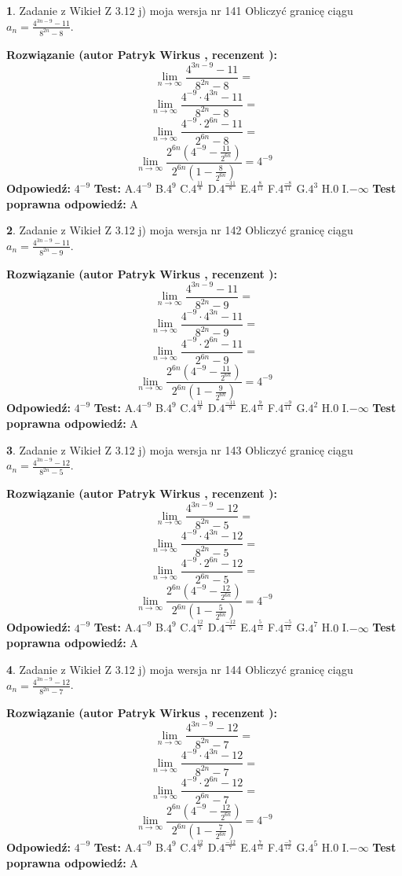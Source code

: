 \documentclass[12pt, a4paper]{article}
\theoremstyle{definition} %
\newtheorem{zad}{}
\newcommand{\zadStart}[1]{\begin{zad}#1\newline}
\newcommand{\zadStop}{\end{zad}}
\newcommand{\rozwStart}[2]{\noindent \textbf{Rozwiązanie (autor #1 , recenzent #2): }\newline}
\newcommand{\rozwStop}{\newline}
\newcommand{\odpStart}{\noindent \textbf{Odpowiedź:}\newline}
\newcommand{\odpStop}{\newline}
\newcommand{\testStart}{\noindent \textbf{Test:}\newline}
\newcommand{\testStop}{\newline}
\newcommand{\kluczStart}{\noindent \textbf{Test poprawna odpowiedź:}\newline}
\newcommand{\kluczStop}{\newline}
\begin{document}
\zadStart{Zadanie z Wikieł Z 3.12 j) moja wersja nr 141}
Obliczyć granicę ciągu $a_{n}=\frac{4^{3n-9}-11}{8^{2n}-8}$.
\zadStop
\rozwStart{Patryk Wirkus}{}
$$\lim\limits_{n\to\infty}\frac{4^{3n-9}-11}{8^{2n}-8}=$$
$$\lim\limits_{n\to\infty}\frac{4^{-9} \cdot 4^{3n}-11}{8^{2n}-8}=$$
$$\lim\limits_{n\to\infty}\frac{4^{-9} \cdot 2^{6n}-11}{2^{6n}-8}=$$
$$\lim\limits_{n\to\infty}\frac{2^{6n}(4^{-9} - \frac{11}{2^{6n}})}{2^{6n}(1-\frac{8}{2^{6n}})}= 4^{-9}$$
\rozwStop
\odpStart
$4^{-9}$
\odpStop
\testStart
A.$4^{-9}$
B.$4^{9}$
C.$4^{\frac{11}{8}}$
D.$4^{\frac{-11}{8}}$
E.$4^{\frac{8}{11}}$
F.$4^{\frac{-8}{11}}$
G.$4^{3}$
H.$0$
I.$-\infty$
\testStop
\kluczStart
A
\kluczStop



\zadStart{Zadanie z Wikieł Z 3.12 j) moja wersja nr 142}
Obliczyć granicę ciągu $a_{n}=\frac{4^{3n-9}-11}{8^{2n}-9}$.
\zadStop
\rozwStart{Patryk Wirkus}{}
$$\lim\limits_{n\to\infty}\frac{4^{3n-9}-11}{8^{2n}-9}=$$
$$\lim\limits_{n\to\infty}\frac{4^{-9} \cdot 4^{3n}-11}{8^{2n}-9}=$$
$$\lim\limits_{n\to\infty}\frac{4^{-9} \cdot 2^{6n}-11}{2^{6n}-9}=$$
$$\lim\limits_{n\to\infty}\frac{2^{6n}(4^{-9} - \frac{11}{2^{6n}})}{2^{6n}(1-\frac{9}{2^{6n}})}= 4^{-9}$$
\rozwStop
\odpStart
$4^{-9}$
\odpStop
\testStart
A.$4^{-9}$
B.$4^{9}$
C.$4^{\frac{11}{9}}$
D.$4^{\frac{-11}{9}}$
E.$4^{\frac{9}{11}}$
F.$4^{\frac{-9}{11}}$
G.$4^{2}$
H.$0$
I.$-\infty$
\testStop
\kluczStart
A
\kluczStop



\zadStart{Zadanie z Wikieł Z 3.12 j) moja wersja nr 143}
Obliczyć granicę ciągu $a_{n}=\frac{4^{3n-9}-12}{8^{2n}-5}$.
\zadStop
\rozwStart{Patryk Wirkus}{}
$$\lim\limits_{n\to\infty}\frac{4^{3n-9}-12}{8^{2n}-5}=$$
$$\lim\limits_{n\to\infty}\frac{4^{-9} \cdot 4^{3n}-12}{8^{2n}-5}=$$
$$\lim\limits_{n\to\infty}\frac{4^{-9} \cdot 2^{6n}-12}{2^{6n}-5}=$$
$$\lim\limits_{n\to\infty}\frac{2^{6n}(4^{-9} - \frac{12}{2^{6n}})}{2^{6n}(1-\frac{5}{2^{6n}})}= 4^{-9}$$
\rozwStop
\odpStart
$4^{-9}$
\odpStop
\testStart
A.$4^{-9}$
B.$4^{9}$
C.$4^{\frac{12}{5}}$
D.$4^{\frac{-12}{5}}$
E.$4^{\frac{5}{12}}$
F.$4^{\frac{-5}{12}}$
G.$4^{7}$
H.$0$
I.$-\infty$
\testStop
\kluczStart
A
\kluczStop



\zadStart{Zadanie z Wikieł Z 3.12 j) moja wersja nr 144}
Obliczyć granicę ciągu $a_{n}=\frac{4^{3n-9}-12}{8^{2n}-7}$.
\zadStop
\rozwStart{Patryk Wirkus}{}
$$\lim\limits_{n\to\infty}\frac{4^{3n-9}-12}{8^{2n}-7}=$$
$$\lim\limits_{n\to\infty}\frac{4^{-9} \cdot 4^{3n}-12}{8^{2n}-7}=$$
$$\lim\limits_{n\to\infty}\frac{4^{-9} \cdot 2^{6n}-12}{2^{6n}-7}=$$
$$\lim\limits_{n\to\infty}\frac{2^{6n}(4^{-9} - \frac{12}{2^{6n}})}{2^{6n}(1-\frac{7}{2^{6n}})}= 4^{-9}$$
\rozwStop
\odpStart
$4^{-9}$
\odpStop
\testStart
A.$4^{-9}$
B.$4^{9}$
C.$4^{\frac{12}{7}}$
D.$4^{\frac{-12}{7}}$
E.$4^{\frac{7}{12}}$
F.$4^{\frac{-7}{12}}$
G.$4^{5}$
H.$0$
I.$-\infty$
\testStop
\kluczStart
A
\kluczStop
\end{document}
